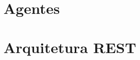 





\section{Agentes} %
\label{sec:agentes}






\section{Arquitetura REST} %
\label{sec:arquitetura_rest}





